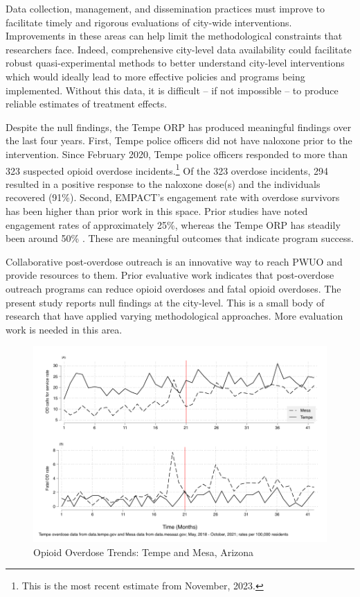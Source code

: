 Data collection, management, and dissemination practices must improve to facilitate timely and rigorous evaluations of city-wide interventions. Improvements in these areas can help limit the methodological constraints that researchers face. Indeed, comprehensive city-level data availability could facilitate robust quasi-experimental methods to better understand city-level interventions which would ideally lead to more effective policies and programs being implemented. Without this data, it is difficult -- if not impossible -- to produce reliable estimates of treatment effects.

Despite the null findings, the Tempe ORP has produced meaningful findings over the last four years. First, Tempe police officers did not have naloxone prior to the intervention. Since February 2020, Tempe police officers responded to more than 323 suspected opioid overdose incidents.\footnote{This is the most recent estimate from November, 2023.} Of the 323 overdose incidents, 294 resulted in a positive response to the naloxone dose(s) and the individuals recovered (91\%). Second, EMPACT's engagement rate with overdose survivors has been higher than prior work in this space. Prior studies have noted engagement rates of approximately 25\%, whereas the Tempe ORP has steadily been around 50\% \parencite{dahlem_recovery_2021, wagner_training_2016, watts_tempe_2023, white_moving_2021}. These are meaningful outcomes that indicate program success. 

Collaborative post-overdose outreach is an innovative way to reach PWUO and provide resources to them. Prior evaluative work indicates that post-overdose outreach programs can reduce opioid overdoses and fatal opioid overdoses. The present study reports null findings at the city-level. This is a small body of research that have applied varying methodological approaches. More evaluation work is needed in this area. 

\pagebreak



\newpage

\begin{figure}
    \caption{\centering Opioid Overdose Trends: Tempe and Mesa, Arizona}
    \includegraphics{figures/rates_combined.pdf}
\end{figure}

